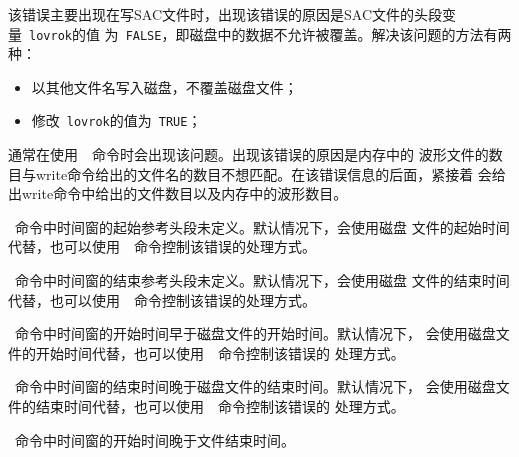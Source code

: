 该错误主要出现在写SAC文件时，出现该错误的原因是SAC文件的头段变量~\verb+lovrok+的值
为~\verb+FALSE+，即磁盘中的数据不允许被覆盖。解决该问题的方法有两种：
\begin{itemize}
\item 以其他文件名写入磁盘，不覆盖磁盘文件；
\item 修改~\verb+lovrok+的值为~\verb+TRUE+；
\end{itemize}

通常在使用~~命令时会出现该问题。出现该错误的原因是内存中的
波形文件的数目与write命令给出的文件名的数目不想匹配。在该错误信息的后面，紧接着
会给出write命令中给出的文件数目以及内存中的波形数目。

~命令中时间窗的起始参考头段未定义。默认情况下，会使用磁盘
文件的起始时间代替，也可以使用~~命令控制该错误的处理方式。

~命令中时间窗的结束参考头段未定义。默认情况下，会使用磁盘
文件的结束时间代替，也可以使用~~命令控制该错误的处理方式。

~命令中时间窗的开始时间早于磁盘文件的开始时间。默认情况下，
会使用磁盘文件的开始时间代替，也可以使用~~命令控制该错误的
处理方式。

~命令中时间窗的结束时间晚于磁盘文件的结束时间。默认情况下，
会使用磁盘文件的结束时间代替，也可以使用~~命令控制该错误的
处理方式。

~命令中时间窗的开始时间晚于文件结束时间。
